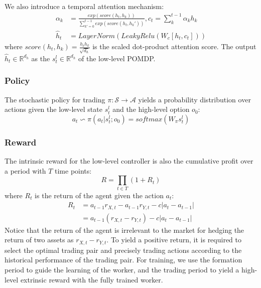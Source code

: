 \documentclass[sigconf]{acmart}
\begin{document}
We also introduce a temporal attention mechanism:
\begin{align}
 \alpha_k &= \frac{
 exp(score(h_{t}, h_k))
 }{
 \sum_{k'=0}^{t-1}
 exp(score(h_t, h_k'))
 },
	c_{t} = \sum_k^{t-1} \alpha_k h_k \\
	\hat{h}_t &= LayerNorm(LeakyRelu(W_c[h_t, c_t]))
\end{align}
where $score(h_t, h_k) = \frac{h_t h_k}{\sqrt{d_h}}$ is the scaled dot-product attention score.
The output $\hat{h}_t \in \mathbb{R}^{d_h}$ as the $s^l_t \in \mathbb{R}^{d_h}$ of the low-level POMDP.
	
\subsubsection{Policy}
The stochastic policy for trading $\pi: \mathcal{S} \rightarrow \mathcal{A}$ yields a probability distribution over actions given the low-level state $s^l_t$ and the high-level option $o_0$:
\begin{equation}
 a_t \backsim \pi(a_t|s^l_t;o_0) = softmax(W_{\pi} s^l_t)
\end{equation}
	
\subsubsection{Reward}
 The intrinsic reward for the low-level controller is also the cumulative profit over a period with $T$ time points:
\begin{equation}
 R = \prod_{t \in T} (1 + R_t)
\end{equation}
where $R_t$ is the return of the agent given the action $a_t$:
\begin{equation}
 \begin{aligned}
 R_t & = a_{t-1} r_{X,t} - a_{t-1} r_{Y, t} - c|a_{t} - a_{t-1}| \\
 & = a_{t-1} (r_{X,t} - r_{Y,t}) - c|a_{t} - a_{t-1}|
 \end{aligned}
\end{equation}
Notice that the return of the agent is irrelevant to the market for hedging the return of two assets as $r_{X,t} - r_{Y,t}$.
To yield a positive return, it is required to select the optimal trading pair and precisely trading actions according to the historical performance of the trading pair.
For training, we use the formation period to guide the learning of the worker, and the trading period to yield a high-level extrinsic reward with the fully trained worker.
	
\end{document}
